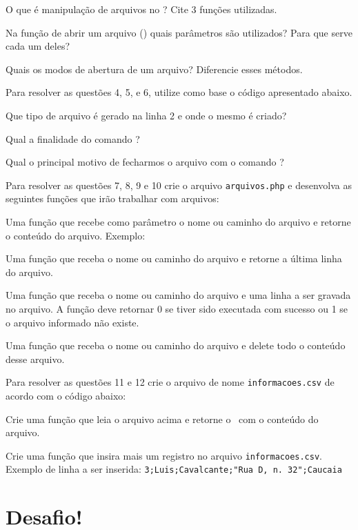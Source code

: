 \begin{description}[labelindent=30pt]
  \item [Q. 01] O que é manipulação de arquivos no \php? Cite 3 funções utilizadas.
  \item [Q. 02] Na função de abrir um arquivo (\funcaofopen) quais parâmetros são utilizados?
  Para que serve cada um deles?
  \item [Q. 03] Quais os modos de abertura de um arquivo? Diferencie esses métodos. 
  \item Para resolver as questões 4, 5, e 6, utilize como base o código apresentado
  abaixo. 
  
  \item [Q. 04] Que tipo de arquivo é gerado na linha 2 e onde o mesmo é criado?
  \item [Q. 05] Qual a finalidade do comando \funcaofwrite?
  \item [Q. 06] Qual o principal motivo de fecharmos o arquivo com o comando \funcaofclose?
  \item Para resolver as questões 7, 8, 9 e 10 crie o arquivo \texttt{arquivos.php} e desenvolva
  as seguintes funções que irão trabalhar com arquivos:
  \item [Q. 07] Uma função que recebe como parâmetro o nome ou caminho do arquivo e retorne o conteúdo 
  do arquivo. Exemplo:
  
  \item [Q. 08] Uma função que receba o nome ou caminho do arquivo e retorne a última linha do arquivo.
  
  \item [Q. 09] Uma função que receba o nome ou caminho do arquivo e uma linha a ser gravada no arquivo. 
  A função deve retornar 0 se tiver sido executada com sucesso ou 1 se o arquivo informado não existe.
  
  \item [Q. 10] Uma função que receba o nome ou caminho do arquivo e delete todo o conteúdo desse arquivo.
  
  \item Para resolver as questões 11 e 12 crie o arquivo de nome \texttt{informacoes.csv} de acordo com
  o código abaixo:
  
  \item [Q. 11] Crie uma função que leia o arquivo acima e retorne o \tipoarray~com o conteúdo do
  arquivo.
  \item [Q. 12] Crie uma função que insira mais um registro no arquivo \texttt{informacoes.csv}. Exemplo
  de linha a ser inserida: \texttt{3;Luis;Cavalcante;"Rua D, n. 32";Caucaia}


\end{description}

\section{Desafio!}
\label{cap9-desafio}